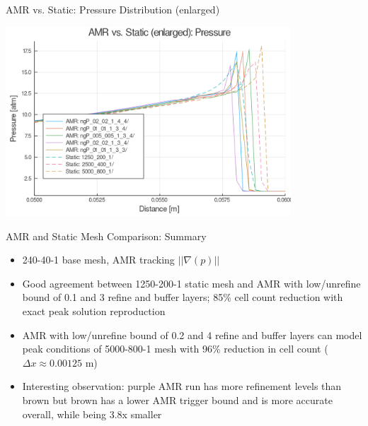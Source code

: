 \begin{frame}{AMR vs. Static: Pressure Distribution (enlarged)}
\begin{center}
\includegraphics[width=0.8\textwidth]{../figs/amrfigs/amrcompare/pe.png}
\end{center}
\end{frame}

\begin{frame}{AMR and Static Mesh Comparison: Summary}
\begin{itemize}
\item 240-40-1 base mesh, AMR tracking $|| \nabla (p)|| $
\item Good agreement between 1250-200-1 static mesh and AMR with low/unrefine bound of 0.1 and 3 refine and buffer layers; 85\% cell count reduction with exact peak solution reproduction
\item AMR with low/unrefine bound of 0.2 and 4 refine and buffer layers can model peak conditions of 5000-800-1 mesh with 96\% reduction in cell count ($\Delta x \approx 0.00125 $ m)
\item Interesting observation: purple AMR run has more refinement levels than brown but brown has a lower AMR trigger bound and is more accurate overall, while being 3.8x smaller
\end{itemize}
\end{frame}

